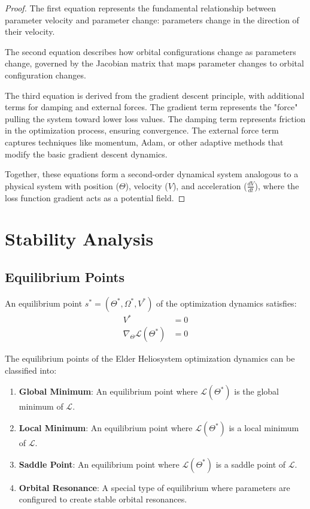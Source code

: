 \begin{proof}
The first equation represents the fundamental relationship between parameter velocity and parameter change: parameters change in the direction of their velocity.

The second equation describes how orbital configurations change as parameters change, governed by the Jacobian matrix that maps parameter changes to orbital configuration changes.

The third equation is derived from the gradient descent principle, with additional terms for damping and external forces. The gradient term represents the "force" pulling the system toward lower loss values. The damping term represents friction in the optimization process, ensuring convergence. The external force term captures techniques like momentum, Adam, or other adaptive methods that modify the basic gradient descent dynamics.

Together, these equations form a second-order dynamical system analogous to a physical system with position ($\Theta$), velocity ($V$), and acceleration ($\frac{dV}{dt}$), where the loss function gradient acts as a potential field.
\end{proof}

\section{Stability Analysis}

\subsection{Equilibrium Points}

\begin{definition}
An equilibrium point $s^* = (\Theta^*, \Omega^*, V^*)$ of the optimization dynamics satisfies:
\begin{align}
V^* &= 0 \\
\nabla_{\Theta} \mathcal{L}(\Theta^*) &= 0
\end{align}
\end{definition}

\begin{theorem}
The equilibrium points of the Elder Heliosystem optimization dynamics can be classified into:
\begin{enumerate}
    \item \textbf{Global Minimum}: An equilibrium point where $\mathcal{L}(\Theta^*)$ is the global minimum of $\mathcal{L}$.
    \item \textbf{Local Minimum}: An equilibrium point where $\mathcal{L}(\Theta^*)$ is a local minimum of $\mathcal{L}$.
    \item \textbf{Saddle Point}: An equilibrium point where $\mathcal{L}(\Theta^*)$ is a saddle point of $\mathcal{L}$.
    \item \textbf{Orbital Resonance}: A special type of equilibrium where parameters are configured to create stable orbital resonances.
\end{enumerate}
\end{theorem}

